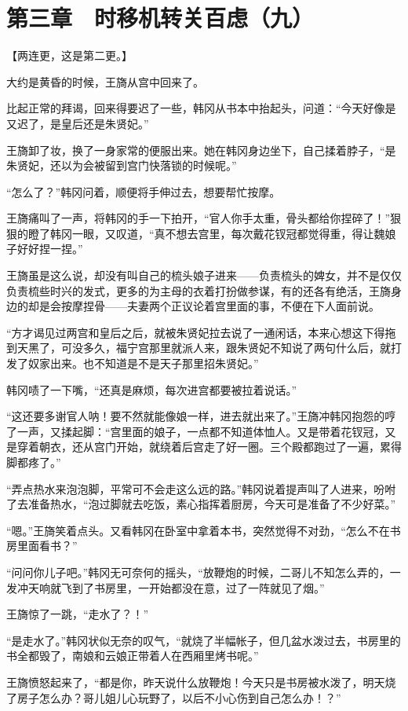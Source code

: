 \section{第三章　时移机转关百虑（九）}

【两连更，这是第二更。】

大约是黄昏的时候，王旖从宫中回来了。

比起正常的拜谒，回来得要迟了一些，韩冈从书本中抬起头，问道：“今天好像是又迟了，是皇后还是朱贤妃。”

王旖卸了妆，换了一身家常的便服出来。她在韩冈身边坐下，自己揉着脖子，“是朱贤妃，还以为会被留到宫门快落锁的时候呢。”

“怎么了？”韩冈问着，顺便将手伸过去，想要帮忙按摩。

王旖痛叫了一声，将韩冈的手一下拍开，“官人你手太重，骨头都给你捏碎了！”狠狠的瞪了韩冈一眼，又叹道，“真不想去宫里，每次戴花钗冠都觉得重，得让魏娘子好好捏一捏。”

王旖虽是这么说，却没有叫自己的梳头娘子进来——负责梳头的婢女，并不是仅仅负责梳些时兴的发式，更多的为主母的衣着打扮做参谋，有的还各有绝活，王旖身边的却是会按摩捏骨——夫妻两个正议论着宫里面的事，不便在下人面前说。

“方才谒见过两宫和皇后之后，就被朱贤妃拉去说了一通闲话，本来心想这下得拖到天黑了，可没多久，福宁宫那里就派人来，跟朱贤妃不知说了两句什么后，就打发了奴家出来。也不知道是不是天子那里招朱贤妃。”

韩冈啧了一下嘴，“还真是麻烦，每次进宫都要被拉着说话。”

“这还要多谢官人呐！要不然就能像娘一样，进去就出来了。”王旖冲韩冈抱怨的哼了一声，又揉起脚：“宫里面的娘子，一点都不知道体恤人。又是带着花钗冠，又是穿着朝衣，还从宫门开始，就绕着后宫走了好一圈。三个殿都跑过了一遍，累得脚都疼了。”

“弄点热水来泡泡脚，平常可不会走这么远的路。”韩冈说着提声叫了人进来，吩咐了去准备热水，“泡过脚就去吃饭，素心指挥着厨房，今天可是准备了不少好菜。”

“嗯。”王旖笑着点头。又看韩冈在卧室中拿着本书，突然觉得不对劲，“怎么不在书房里面看书？”

“问问你儿子吧。”韩冈无可奈何的摇头，“放鞭炮的时候，二哥儿不知怎么弄的，一发冲天响就飞到了书房里，一开始都没在意，过了一阵就见了烟。”

王旖惊了一跳，“走水了？！”

“是走水了。”韩冈状似无奈的叹气，“就烧了半幅帐子，但几盆水泼过去，书房里的书全都毁了，南娘和云娘正带着人在西厢里烤书呢。”

王旖愤怒起来了，“都是你，昨天说什么放鞭炮！今天只是书房被水泼了，明天烧了房子怎么办？哥儿姐儿心玩野了，以后不小心伤到自己怎么办！？”

